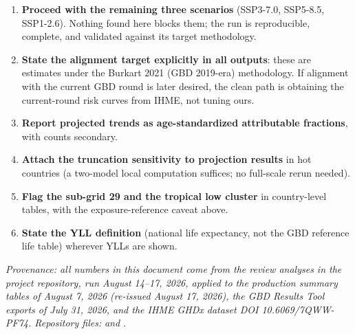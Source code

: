 \documentclass[11pt]{ozreport}
\begin{document}
\begin{enumerate}
\item \textbf{Proceed with the remaining three scenarios} (SSP3-7.0,
  SSP5-8.5, SSP1-2.6). Nothing found here blocks them; the run is
  reproducible, complete, and validated against its target methodology.
\item \textbf{State the alignment target explicitly in all outputs}: these
  are estimates under the Burkart 2021 (GBD 2019-era) methodology. If
  alignment with the current GBD round is later desired, the clean path is
  obtaining the current-round risk curves from IHME, not tuning ours.
\item \textbf{Report projected trends as age-standardized attributable
  fractions}, with counts secondary.
\item \textbf{Attach the truncation sensitivity to projection results} in
  hot countries (a two-model local computation suffices; no full-scale
  rerun needed).
\item \textbf{Flag the sub-grid 29 and the tropical low cluster} in
  country-level tables, with the exposure-reference caveat above.
\item \textbf{State the YLL definition} (national life expectancy, not the
  GBD reference life table) wherever YLLs are shown.
\end{enumerate}

\medskip
{\raggedright
\noindent\textit{Provenance: all numbers in this document come from the
review analyses in the project repository, run August 14--17, 2026,
applied to the production summary tables of August 7, 2026 (re-issued
August 17, 2026), the GBD Results Tool exports of July 31, 2026, and the
IHME GHDx dataset DOI 10.6069/7QWW-PF74. Repository files:}
 \textit{and}
\textit{.}
\par}
\end{document}
